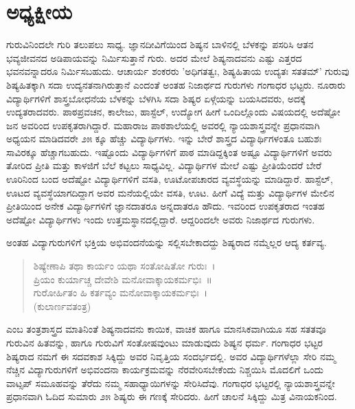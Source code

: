 {\fontsize{14}{16}\selectfont
\chapter{ಅಧ್ಯಕ್ಷೀಯ}

ಗುರುವಿನಿಂದಲೇ ಗುರಿ ತಲುಪಲು ಸಾಧ್ಯ. ಜ್ಞಾನದೀವಿಗೆಯಿಂದ ಶಿಷ್ಯನ ಬಾಳಿನಲ್ಲಿ ಬೆಳಕನ್ನು ಪಸರಿಸಿ ಆತನ ಭವ್ಯಜೀವನದ ಅಡಿಪಾಯವನ್ನು ನಿರ್ಮಿಸುತ್ತಾನೆ ಗುರು. ಅದರ ಮೇಲೆ ಶಿಷ್ಯನಾದವನು ಎಷ್ಟು ಎತ್ತರದ ಭವನವನ್ನಾದರೂ ನಿರ್ಮಿಸಬಹುದು. ಆಚಾರ್ಯ ಶಂಕರರು ’ಅಧಿಗತತ್ವಃ, ಶಿಷ್ಯಹಿತಾಯ ಉದ್ಯತಃ ಸತತಮ್’ \eng{-} ಗುರುವು ಶಿಷ್ಯಹಿತಕ್ಕಾಗಿ ಸದಾ ಉದ್ಯನತನಾಗಿರುತ್ತಾನೆ ಎಂದಂತೆ ಅಂತಹ ನಿಜಾರ್ಥದ ಗುರುಗಳು ಗಂಗಾಧರ ಭಟ್ಟರು. ನೂರಾರು ವಿದ್ಯಾರ್ಥಿಗಳಿಗೆ ಶಾಸ್ತ್ರಬೋಧನೆಯ ಬೆಳಕನ್ನು ಬೆಳಗಿಸಿ ಸದಾ ಶಿಷ್ಯರ ಏಳ್ಗೆಯನ್ನು ಬಯಸಿದವರು, ಅದಕ್ಕೆ ಉದ್ಯತರಾದವರು. ಪಾಠ\eng{-}ಪ್ರವಚನ, ಕಾಲೇಜು, ಹಾಸ್ಟೆಲ್, ಉದ್ಯೋಗ ಹೀಗೆ ಒಂದಿಲ್ಲೊಂದು ವಿಷಯದಲ್ಲಿ ಅದೆಷ್ಟೋ ಜನ ಅವರಿಂದ ಉಪಕೃತರಾಗಿದ್ದಾರೆ. ಮಹಾರಾಜ ಪಾಠಶಾಲೆಯಲ್ಲಿ ಅವರಲ್ಲಿ ನ್ಯಾಯಶಾಸ್ತ್ರವನ್ನೇ ಪ್ರಧಾನವಾಗಿ ಅಧ್ಯಯನ ಮಾಡಿದವರೇ ೨೫ ಕ್ಕೂ ಹೆಚ್ಚು ವಿದ್ಯಾರ್ಥಿಗಳು. ಇನ್ನು ಬೇರೆ ಶಾಸ್ತ್ರದ ವಿದ್ಯಾರ್ಥಿಗಳಂತೂ ಬಹುಶಃ ಸಾವಿರಕ್ಕೂ ಹೆಚ್ಚಾಗಬಹುದು. ಇಷ್ಟೊಂದು ವಿದ್ಯಾರ್ಥಿಗಳಿಗೆ ಪಾಠ ಮಾಡಿದ್ದಕ್ಕಿಂತ ಅಷ್ಟೂ ವಿದ್ಯಾರ್ಥಿಗಳಿಗೆ ಅವರು ತೋರಿದ ಪ್ರೀತಿ ಮತ್ತು ಕಾಳಜಿಗೆ ಬೆಲೆ ಕಟ್ಟಲು ಸಾಧ್ಯವಿಲ್ಲ. ವಿದ್ಯಾರ್ಥಿಗಳ ಮೇಲೆ ಎಷ್ಟು ಪ್ರೀತಿಯೆಂದರೆ ಬೇರೆ ಊರಿನಿಂದ ಬಂದ ಅದೆಷ್ಟೋ ವಿದ್ಯಾರ್ಥಿಗಳಿಗೆ ವಸತಿ, ಊಟೋಪಚಾರದ ವ್ಯವಸ್ಥೆಯನ್ನು ಮಾಡಿದ್ದಾರೆ. ಹಾಸ್ಟೆಲ್, ಊಟದ ವ್ಯವಸ್ಥೆಯಾಗದಿದ್ದಾಗ ಅವರ ಮನೆಯಲ್ಲಿಯೇ ವಸತಿ, ಊಟ. ಹೀಗೆ ವಿದ್ಯೆ ಮತ್ತು ವಿದ್ಯಾರ್ಥಿಗಳ ಮೇಲಿನ ಪ್ರೀತಿಯಿಂದ ಅನೇಕ ವಿದ್ಯಾರ್ಥಿಗಳಿಗೆ ಜ್ಞಾನದಾತರೂ ಅನ್ನದಾತರೂ ಹೌದು. ಇವರಿಂದ ಉಪಕೃತರಾದ ಇಂತಹ ಅದೆಷ್ಟೋ ವಿದ್ಯಾರ್ಥಿಗಳು ಇಂದು ಉತ್ತಮಸ್ಥಾನದಲ್ಲಿದ್ದಾರೆ. ಆದ್ದರಿಂದಲೇ ಅವರು ನಿಜಾರ್ಥದ ಗುರುಗಳು.

ಅಂತಹ ವಿದ್ಯಾಗುರುಗಳಿಗೆ ಭಕ್ತಿಯ ಅಭಿವಂದನೆಯನ್ನು ಸಲ್ಲಿಸಬೇಕಾದದ್ದು ಶಿಷ್ಯರಾದ ನಮ್ಮೆಲ್ಲರ ಆದ್ಯ ಕರ್ತವ್ಯ.
\begin{verse}
ಶಿಷ್ಯೇಣಾಪಿ ತಥಾ ಕಾರ್ಯಂ ಯಥಾ ಸಂತೋಷಿತೋ ಗುರುಃ~।\\
ಪ್ರಿಯಂ ಕುರ್ಯಾಚ್ಚ ದೇವೇಶಿ ಮನೋವಾಕ್ಕಾಯಕರ್ಮಭಿಃ~॥\\
ಗುರೋರ್ಹಿತಂ ಹಿ ಕರ್ತವ್ಯಂ ಮನೋವಾಕ್ಕಾಯಕರ್ಮಭಿಃ~।\\ 
\hspace{6cm}(ಕುಲಾರ್ಣವತಂತ್ರ)
\end{verse}
\bigskip

\noindent
ಎಂಬ ತಂತ್ರಶಾಸ್ತ್ರದ ಮಾತಿನಿಂತೆ ಶಿಷ್ಯನಾದವನು ಕಾಯಿಕ, ವಾಚಿಕ ಹಾಗೂ ಮಾನಸಿಕವಾಗಿಯೂ ಸಹ ಸತತವೂ ಗುರುವಿನ ಹಿತವನ್ನು, ಹಾಗೂ ಗುರುವಿಗೆ ಸಂತೋಷವುಂಟು ಮಾಡುವುದು ಶಿಷ್ಯನ ಧರ್ಮ. ಗಂಗಾಧರ ಭಟ್ಟರ ಶಿಷ್ಯರಾದ ನಮಗೆ ಈ ಸದವಕಾಶ ಸಿಕ್ಕಿದ್ದು ಅವರ ನಿವೃತ್ತಿಯ ಸಂದರ್ಭದಲ್ಲಿ. ಅವರ ವಿದ್ಯಾರ್ಥಿಗಳೆಲ್ಲಾ ಸೇರಿ ನಮ್ಮ ನೆಚ್ಚಿನ ವಿದ್ಯಾಗುರುಗಳಿಗೆ ಅಭಿವಂದನಾ ಕಾರ್ಯಕ್ರಮವನ್ನು ನೆರವೇರಿಸಬೇಕೆಂದು ನಿಶ್ಚಯಿಸಿ ಮೊದಲಿಗೆ ಒಂದು ವಾಟ್ಸಪ್ ಸಮೂಹವನ್ನು ತೆರೆದು ನಮ್ಮ ಸಹಾಧ್ಯಾಯಿಗಳನ್ನು ಸೇರಿಸಿದೆವು. ಗಂಗಾಧರ ಭಟ್ಟರಲ್ಲಿ ನ್ಯಾಯಶಾಸ್ತ್ರವನ್ನೇ ಪ್ರಧಾನವಾಗಿ ಓದಿದ ಸುಮಾರು ೨೫ ಶಿಷ್ಯರು ಈ ಗಣಕ್ಕೆ ಸೇರಿದರು. ಹೀಗೆ ಚಾಲನೆ ಸಿಕ್ಕಿದ್ದು ಮಿತ್ರ ವಿನಾಯಕನಿಂದ.

}
